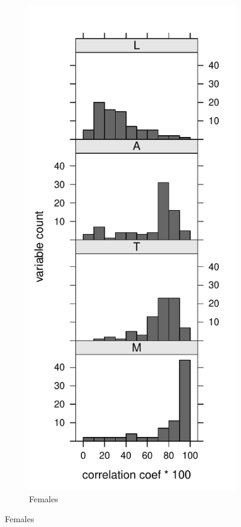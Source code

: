 \documentclass[11pt,oneside]{article} %
\begin{document}
\begin{figure}
\centering
\caption{Major patterns of variation, all 78 variables examined}
\label{fig:correlations}
 \begin{subfigure}{.5\linewidth}
 \caption{Females}
  \vspace{-2em}
 \includegraphics[scale=.8]{Figures/HistFem.pdf}

\end{subfigure}
\end{figure}
\end{document}
